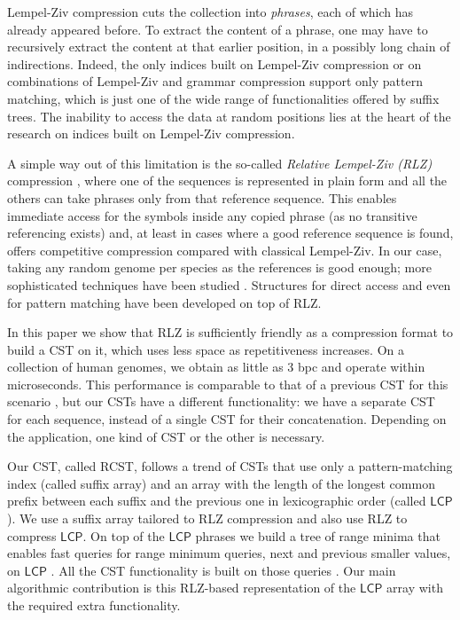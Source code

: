 \documentclass[a4paper,11pt]{llncs}
\newcommand{\LCP}{\textsf{LCP}}
\begin{document}
Lempel-Ziv compression cuts the collection into {\em phrases}, each of which
has already appeared before. To extract the content of a phrase, one may have
to recursively extract the content at that earlier position, in a possibly long
chain of indirections.
Indeed, the only indices built on Lempel-Ziv compression \cite{KN13} or on
combinations of Lempel-Ziv and grammar compression \cite{GGKNP12,GGKNP14,GP15}
support only pattern matching, which is just one of the wide range of 
functionalities offered by suffix trees. The inability to access the data
at random positions lies at the heart of the research on indices built on
Lempel-Ziv compression. 

A simple way out of this limitation is the so-called {\em Relative Lempel-Ziv
(RLZ)} compression \cite{Kuruppu2010}, where one of the sequences is represented
in plain form and all the others can take phrases only from that reference
sequence. This enables immediate access for the symbols inside any copied
phrase (as no transitive referencing exists) and, at least in cases where a
good reference sequence is found, offers competitive compression compared with
classical Lempel-Ziv. In our case, taking any random genome per species as the
references is good enough; more sophisticated techniques have been studied
\cite{KPZ11}. Structures for direct access \cite{DG11,Ferrada2014}
and even for pattern matching \cite{DJSS14,Belazzougui2014} have been developed
on top of RLZ.

In this paper we show that RLZ is sufficiently friendly as a compression format
to build a CST on it, which uses less space as repetitiveness increases. 
On a collection of human genomes, we obtain as little as 3 bpc and operate 
within microseconds. This performance is comparable to that of a previous CST 
for this scenario \cite{Navarro2014}, but our CSTs have a different 
functionality: we have a separate CST for each sequence, instead of a single
CST for their concatenation. Depending on the application, one kind of CST or
the other is necessary. 

Our CST, called RCST, follows a trend of CSTs \cite{Fischer2009a,Ohlebusch2009,Ohlebusch2010,Gog2011a,Abeliuk2013} that use only a pattern-matching index 
(called suffix array) and an array with the length of the longest common prefix
between each suffix and the previous one in lexicographic order (called $\LCP$).
We use a suffix array tailored to RLZ compression \cite{Belazzougui2014} and 
also use RLZ to compress $\LCP$. On top of the $\LCP$ phrases we build a tree
of range minima that enables fast queries for range minimum queries, next and
previous smaller values, on $\LCP$ \cite{Abeliuk2013}. All the CST functionality
is built on those queries \cite{Fischer2009a}. Our main algorithmic contribution
is this RLZ-based representation of the $\LCP$ array with the required extra
functionality.
\end{document}
